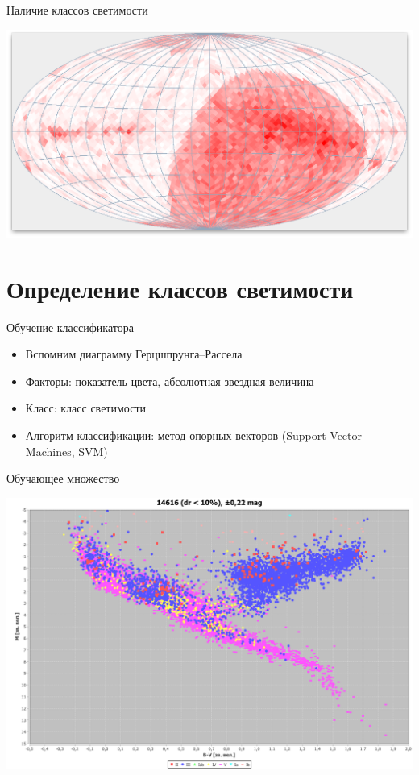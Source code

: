 \documentclass[14pt, fleqn, xcolor={dvipsnames, table}]{beamer}
\begin{document}
        \begin{frame}{Наличие классов светимости}
            \begin{center}
                \includegraphics[scale=0.32]{count-white.png}
            \end{center}             
        \end{frame}

    \section{Определение классов светимости}                
        
        \begin{frame}{Обучение классификатора}
            \begin{itemize}
                \item Вспомним диаграмму Герцшпрунга--Рассела
                \item Факторы: показатель цвета, абсолютная звездная величина
                \item Класс: класс светимости
                \item Алгоритм классификации: метод опорных векторов (Support Vector Machines, SVM)
            \end{itemize}
        \end{frame}        
        
        \begin{frame}{Обучающее множество}
            \begin{center}
                \includegraphics[scale=0.25]{ml-1.png}
            \end{center}             
        \end{frame}
        
\end{document}

